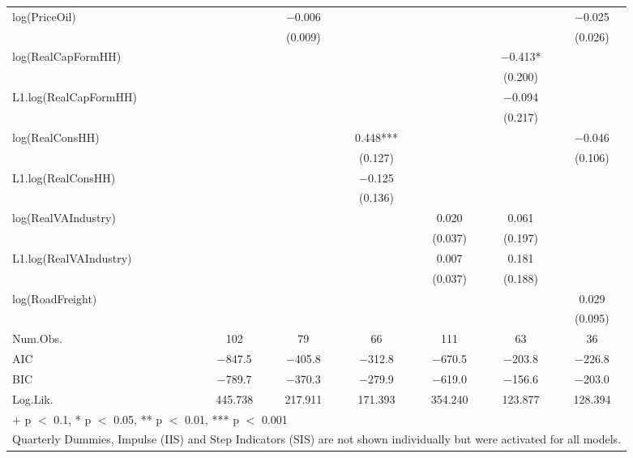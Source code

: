 \begin{table}
{\begin{tabular}[t]{lcccccc}
log(PriceOil) &  & \num{-0.006} &  &  &  & \num{-0.025}\\
 &  & (\num{0.009}) &  &  &  & (\num{0.026})\\
log(RealCapFormHH) &  &  &  &  & \num{-0.413}* & \\
 &  &  &  &  & (\num{0.200}) & \\
L1.log(RealCapFormHH) &  &  &  &  & \num{-0.094} & \\
 &  &  &  &  & (\num{0.217}) & \\
log(RealConsHH) &  &  & \num{0.448}*** &  &  & \num{-0.046}\\
 &  &  & (\num{0.127}) &  &  & (\num{0.106})\\
L1.log(RealConsHH) &  &  & \num{-0.125} &  &  & \\
 &  &  & (\num{0.136}) &  &  & \\
log(RealVAIndustry) &  &  &  & \num{0.020} & \num{0.061} & \\
 &  &  &  & (\num{0.037}) & (\num{0.197}) & \\
L1.log(RealVAIndustry) &  &  &  & \num{0.007} & \num{0.181} & \\
 &  &  &  & (\num{0.037}) & (\num{0.188}) & \\
log(RoadFreight) &  &  &  &  &  & \num{0.029}\\
 &  &  &  &  &  & (\num{0.095})\\
\midrule
Num.Obs. & \num{102} & \num{79} & \num{66} & \num{111} & \num{63} & \num{36}\\
AIC & \num{-847.5} & \num{-405.8} & \num{-312.8} & \num{-670.5} & \num{-203.8} & \num{-226.8}\\
BIC & \num{-789.7} & \num{-370.3} & \num{-279.9} & \num{-619.0} & \num{-156.6} & \num{-203.0}\\
Log.Lik. & \num{445.738} & \num{217.911} & \num{171.393} & \num{354.240} & \num{123.877} & \num{128.394}\\
\bottomrule
\multicolumn{7}{l}{\rule{0pt}{1em}+ p $<$ 0.1, * p $<$ 0.05, ** p $<$ 0.01, *** p $<$ 0.001}\\
\multicolumn{7}{l}{\rule{0pt}{1em}Quarterly Dummies, Impulse (IIS) and Step Indicators (SIS) are not shown individually but were activated for all models.}\\
\end{tabular}}
\end{table}
